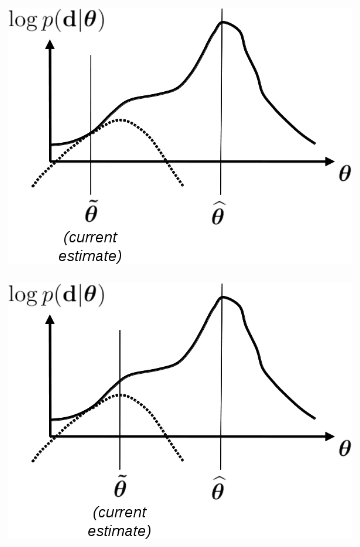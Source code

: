 \documentclass[10pt,twoside]{book}
\begin{document}
\begin{figure}
  \centering
  \begin{subfigure}{0.48\textwidth}
    \centering
    \includegraphics[width=\textwidth]{lowerBound1}
    \caption{}
    \label{fig:lowerboundOptimization_1}
  \end{subfigure}
  \hfill
  \begin{subfigure}{0.48\textwidth}
    \centering
    \includegraphics[width=\textwidth]{lowerBound2}
    \caption{}
    \label{fig:lowerboundOptimization_2}
  \end{subfigure}
  \begin{subfigure}{0.48\textwidth}
    \centering

\end{subfigure}
\end{figure}
\end{document}
